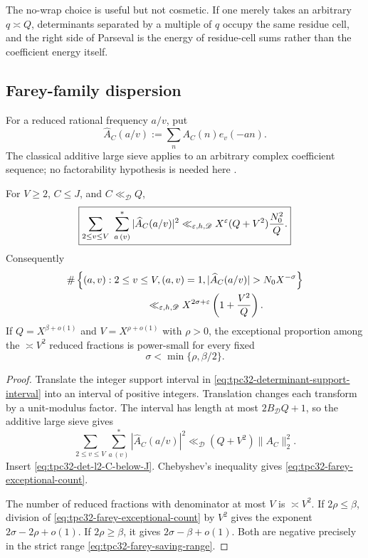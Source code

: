 The no-wrap choice is useful but not cosmetic.  If one merely takes an
arbitrary $q\asymp Q$, determinants separated by a multiple of $q$
occupy the same residue cell, and the right side of Parseval is the
energy of residue-cell sums rather than the coefficient energy itself.

\subsection{Farey-family dispersion}

For a reduced rational frequency $a/v$, put
\begin{equation}
 \widehat A_C(a/v)
 :=\sum_n A_C(n)e_v(-an).
 \label{eq:tpc32-rational-det-transform}
\end{equation}
The classical additive large sieve applies to an arbitrary complex
coefficient sequence; no factorability hypothesis is needed here
\citep{IwaniecKowalski2004}.

\begin{theorem}
\label{thm:tpc32-farey-large-sieve}
For $V\ge2$, $C\le J$, and $C\ll_{\mathscr D}Q$,
\begin{equation}
 \boxed{
 \sum_{2\le v\le V}\ \sum_{a\, (v)}^{*}
 |\widehat A_C(a/v)|^2
 \ll_{\varepsilon,h,\mathscr D}
 X^\varepsilon(Q+V^2)\frac{N_0^2}{Q}.}
 \label{eq:tpc32-farey-large-sieve}
\end{equation}
Consequently
\begin{align}
 &\#\left\{(a,v):2\le v\le V, (a,v)=1,
 |\widehat A_C(a/v)|>N_0X^{-\sigma}\right\}
 \notag\\
 &\hspace{8em}\ll_{\eps,h,\mathscr D}
 X^{2\sigma+\eps}\left(1+\frac{V^2}{Q}\right).
 \label{eq:tpc32-farey-exceptional-count}
\end{align}
If $Q=X^{\beta+o(1)}$ and $V=X^{\rho+o(1)}$ with $\rho>0$, the
exceptional proportion among the $\asymp V^2$ reduced fractions is
power-small for every fixed
\begin{equation}
 \boxed{\sigma<\min\{\rho,\beta/2\}.}
 \label{eq:tpc32-farey-saving-range}
\end{equation}
\end{theorem}

\begin{proof}
Translate the integer support interval in
\eqref{eq:tpc32-determinant-support-interval} into an interval of
positive integers.  Translation changes each transform by a
unit-modulus factor.  The interval has length at most
$2B_{\mathscr D}Q+1$, so the additive large sieve gives
\[
 \sum_{2\le v\le V}\sum_{a\, (v)}^*
 |\widehat A_C(a/v)|^2
 \ll_{\mathscr D}(Q+V^2)\|A_C\|_2^2.
\]
Insert \eqref{eq:tpc32-det-l2-C-below-J}.  Chebyshev's inequality gives
\eqref{eq:tpc32-farey-exceptional-count}.

The number of reduced fractions with denominator at most $V$ is
$\asymp V^2$.  If $2\rho\le\beta$, division of
\eqref{eq:tpc32-farey-exceptional-count} by $V^2$ gives the exponent
$2\sigma-2\rho+o(1)$.  If $2\rho\ge\beta$, it gives
$2\sigma-\beta+o(1)$.  Both are negative precisely in the strict range
\eqref{eq:tpc32-farey-saving-range}.
\end{proof}

